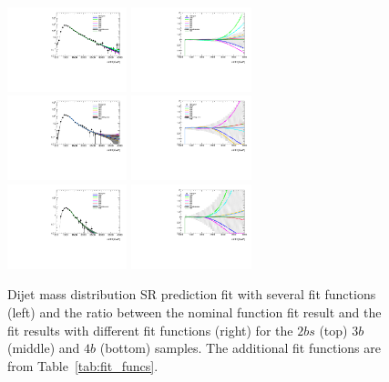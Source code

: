 \begin{figure}[htb!]
\begin{center}
\includegraphics[width=0.31\textwidth,angle=-90]{figures/boosted/Syst_Smooth/smoothFuncCompare_22_comp.pdf}
\includegraphics[width=0.31\textwidth,angle=-90]{figures/boosted/Syst_Smooth/smoothFuncCompare_22_comp_ratio.pdf} \\
\includegraphics[width=0.31\textwidth,angle=-90]{figures/boosted/Syst_Smooth/smoothFuncCompare_33_comp.pdf}
\includegraphics[width=0.31\textwidth,angle=-90]{figures/boosted/Syst_Smooth/smoothFuncCompare_33_comp_ratio.pdf} \\
\includegraphics[width=0.31\textwidth,angle=-90]{figures/boosted/Syst_Smooth/smoothFuncCompare_44_comp.pdf}
\includegraphics[width=0.31\textwidth,angle=-90]{figures/boosted/Syst_Smooth/smoothFuncCompare_44_comp_ratio.pdf} \\
\caption{ Dijet mass distribution SR prediction fit with several fit functions (left) and the ratio between the nominal function fit result and the fit results with different fit functions (right)  for the $2bs$ (top) $3b$ (middle) and $4b$ (bottom) samples. The additional fit functions are from Table~\ref{tab:fit_funcs}.}
\label{fig:qcd_fit_funcs_sys}
\end{center}
\end{figure}